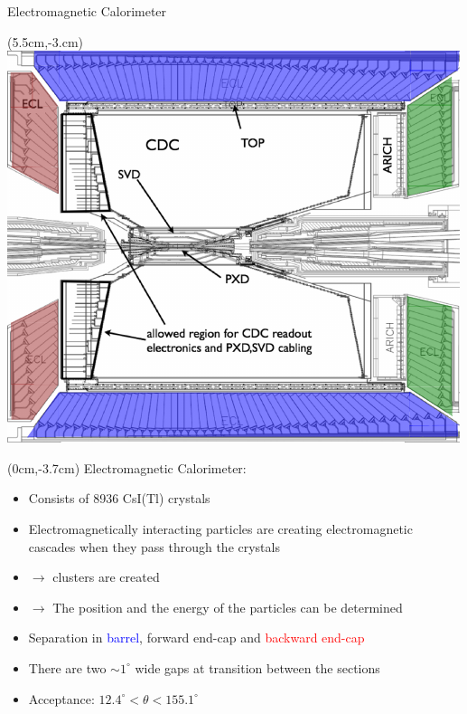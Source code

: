 \documentclass[8pt]{beamer}
\begin{document}
\begin{frame}{Electromagnetic Calorimeter}
	\begin{textblock*}{6cm}(5.5cm,-3.cm)
		\includegraphics[width=\textwidth]{VBilder/ecl2}
	\end{textblock*}

\begin{textblock*}{5.2cm}(0cm,-3.7cm)
	Electromagnetic Calorimeter:
	\begin{itemize}
		\item Consists of 8936 CsI(Tl) crystals
		\item Electromagnetically interacting particles are  creating electromagnetic cascades when they pass through the crystals
		\item[] $\rightarrow$ clusters are created
		\item[] $\rightarrow$ The position and the energy of the particles can be determined
		\item Separation in \textcolor{blue}{barrel}, \textcolor{OliveGreen}{forward end-cap} and \textcolor{red}{backward end-cap}
		\item There are two $\sim 1^{\circ}$ wide gaps at transition between the sections 
		\item Acceptance: $12.4^{\circ} < \theta < 155.1^{\circ}$ 
	\end{itemize}
\end{textblock*}


\end{frame}
\end{document}
